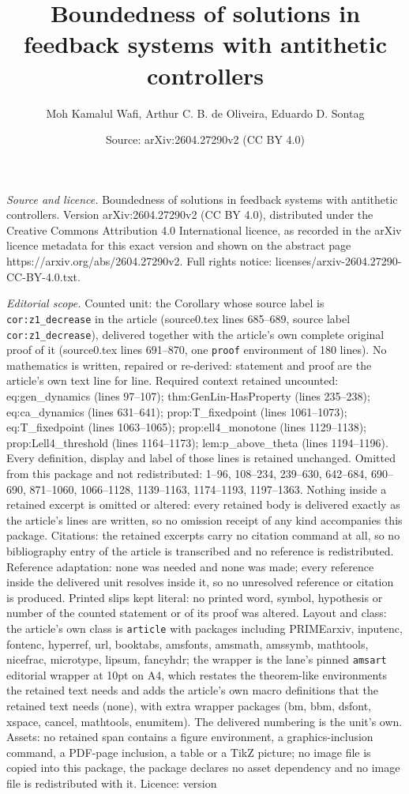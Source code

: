 \documentclass[10pt,a4paper]{amsart}
\title[Boundedness of solutions in feedback systems with antithetic]{Boundedness of solutions in feedback systems with antithetic controllers}
\author{Moh Kamalul Wafi, Arthur C. B. de Oliveira, Eduardo D. Sontag}
\date{Source: arXiv:2604.27290v2 (CC BY 4.0)}
\begin{document}
\maketitle

\noindent\emph{Source and licence.} Boundedness of solutions in feedback systems with antithetic controllers. Version arXiv:2604.27290v2 (CC BY 4.0), distributed under the Creative Commons Attribution 4.0 International licence, as recorded in the arXiv licence metadata for this exact version and shown on the abstract page https://arxiv.org/abs/2604.27290v2. Full rights notice: licenses/arxiv-2604.27290-CC-BY-4.0.txt.\par\smallskip

\noindent\textit{Editorial scope.} Counted unit: the Corollary whose source label is \texttt{cor:z1\_decrease} in the article (source0.tex lines 685--689, source label \texttt{cor:z1\_decrease}), delivered together with the article's own complete original proof of it (source0.tex lines 691--870, one \texttt{proof} environment of 180 lines). No mathematics is written, repaired or re-derived: statement and proof are the article's own text line for line. Required context retained uncounted: eq:gen\_dynamics (lines 97--107); thm:GenLin-HasProperty (lines 235--238); eq:ca\_dynamics (lines 631--641); prop:T\_fixedpoint (lines 1061--1073); eq:T\_fixedpoint (lines 1063--1065); prop:ell4\_monotone (lines 1129--1138); prop:Lell4\_threshold (lines 1164--1173); lem:p\_above\_theta (lines 1194--1196). Every definition, display and label of those lines is retained unchanged. Omitted from this package and not redistributed: 1--96, 108--234, 239--630, 642--684, 690--690, 871--1060, 1066--1128, 1139--1163, 1174--1193, 1197--1363. Nothing inside a retained excerpt is omitted or altered: every retained body is delivered exactly as the article's lines are written, so no omission receipt of any kind accompanies this package. Citations: the retained excerpts carry no citation command at all, so no bibliography entry of the article is transcribed and no reference is redistributed. Reference adaptation: none was needed and none was made; every reference inside the delivered unit resolves inside it, so no unresolved reference or citation is produced. Printed slips kept literal: no printed word, symbol, hypothesis or number of the counted statement or of its proof was altered. Layout and class: the article's own class is \texttt{article} with packages including PRIMEarxiv, inputenc, fontenc, hyperref, url, booktabs, amsfonts, amsmath, amssymb, mathtools, nicefrac, microtype, lipsum, fancyhdr; the wrapper is the lane's pinned \texttt{amsart} editorial wrapper at 10pt on A4, which restates the theorem-like environments the retained text needs and adds the article's own macro definitions that the retained text needs (none), with extra wrapper packages (bm, bbm, dsfont, xspace, cancel, mathtools, enumitem). The delivered numbering is the unit's own. Assets: no retained span contains a figure environment, a graphics-inclusion command, a PDF-page inclusion, a table or a TikZ picture; no image file is copied into this package, the package declares no asset dependency and no image file is redistributed with it. Licence: version 
\end{document}
